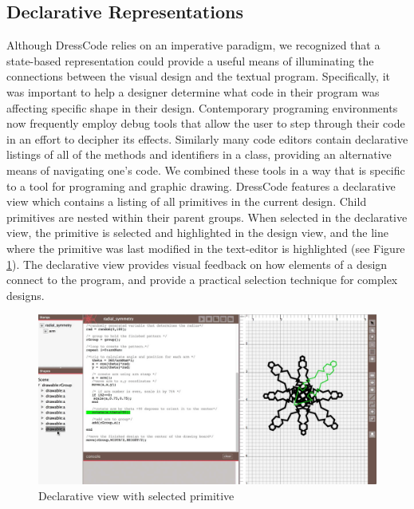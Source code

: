 \documentclass{sigchi}
\begin{document}
\subsection{Declarative Representations}
Although DressCode relies on an imperative paradigm, we recognized that a state-based representation could provide a useful means of illuminating the connections between the visual design and the textual program. Specifically, it was important to help a designer determine what code in their program was affecting specific shape in their design. Contemporary programing environments now frequently employ debug tools that allow the user to step through their code in an effort to decipher its effects. Similarly many code editors contain declarative listings of all of the methods and identifiers in a class, providing an alternative means of navigating one's code. We combined these tools in a way that is specific to a tool for programing and graphic drawing. DressCode features a declarative view which contains a listing of all primitives in the current design. Child primitives are nested within their parent groups. When selected in the declarative view, the primitive is selected and highlighted in the design view, and the line where the primitive was last modified in the text-editor is highlighted (see Figure \ref{fig:declarative_view}). The declarative view provides visual feedback on how elements of a design connect to the program, and provide a practical selection technique for complex designs.

\begin{center}
\begin{figure}[h!]
\includegraphics[width=\columnwidth]{images/selection_mechanism.jpg}
\caption{Declarative view with selected primitive}
\label{fig:declarative_view}
\end{figure}
\end{center}
\vspace{-20pt}
\end{document}
